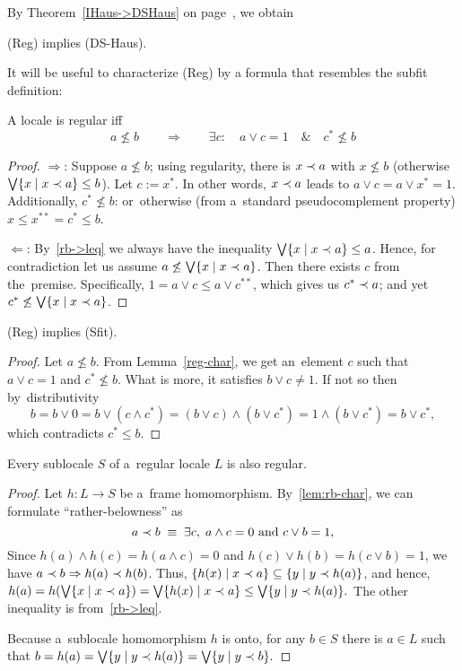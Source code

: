 By Theorem~\ref{IHaus->DSHaus} on page~\pageref{IHaus->DSHaus}\thinspace, we
obtain
\begin{cor}
  (Reg) implies (DS-Haus).
\end{cor}

It will be useful to characterize (Reg) by a formula that resembles the subfit
definition:
\begin{lem} \label{reg-char}
  A locale is regular iff
  \[
    a \not\le b \qquad \Rightarrow \qquad \exists c: \quad a \vee c = 1 \quad
    \& \quad c^* \not\leq b
  \]
\end{lem}
\begin{proof}
  $\Rightarrow$:
  Suppose $a \not\le b$;
  using regularity, there is $x \prec a$ with $x \not\le b$ (otherwise $\bigvee
  \{x \mid x \prec a\} \le b$).
  Let $c := x^*$.
  In other words, $x \prec a$ leads to $a \vee c = a \vee x^* = 1$.
  Additionally, $c^* \not\le b$:
  or~otherwise (from a~standard pseudocomplement property) $x \le x^{**} = c^*
  \le b$.

  $\Leftarrow$:
  By~\ref{rb->leq} we always have the inequality $\bigvee \{x \mid x \prec a\} \le
  a$.
  Hence, for contradiction let us assume $a \not\le \bigvee \{x \mid x \prec a\}$.
  Then there exists $c$ from the~premise.
  Specifically, $1 = a \vee c \le a \vee c^{**}$, which gives us $c^* \prec a$;
  and yet $c^* \not\le \bigvee \{x \mid x \prec a\}$.
\end{proof}

\begin{thm} \label{thm:reg->sfit}
  (Reg) implies (Sfit).
\end{thm}
\begin{proof}
  Let $a \not\le b$.
  From Lemma~\ref{reg-char}\thinspace, we get an~element $c$ such that $a \vee
  c = 1$ and $c^* \not\le b$.
  What is more, it satisfies $b \vee c \ne 1$.
  If not so then by~distributivity
  \[
    b = b \vee 0 = b \vee (c \wedge c^*) = (b \vee c) \wedge (b \vee c^*) = 1
    \wedge (b \vee c^*) = b \vee c^*,
  \]
  which contradicts $c^* \le b$.
\end{proof}

\begin{prop} \label{prop:sloc-of-reg}
  Every sublocale $S$ of a~regular locale $L$ is also regular.
\end{prop}
\begin{proof}
  Let $h\colon L \to S$ be a~frame homomorphism.
  By~\ref{lem:rb-char}, we can formulate ``rather-belowness'' as
  \[
    a \prec b 
    \; \equiv \;
    \exists c, \; a \wedge c = 0 \text{ and } c \vee b = 1,
  \]
  Since $h(a) \wedge h(c) = h(a \wedge c) = 0$ and $h(c) \vee h(b) = h(c \vee
  b) = 1$, we have $a \prec b \Rightarrow h(a) \prec h(b)$.
  Thus, $\{ h(x) \mid x \prec a\} \subseteq \{ y \mid y \prec h(a)\}$, and hence,
  $
    h(a)
    = h (\bigvee \{ x \mid x \prec a\})
    = \bigvee \{ h(x) \mid x \prec a\}
    \le \bigvee \{ y \mid y \prec h(a) \}.
  $
  The other inequality is from~\ref{rb->leq}.

  Because a~sublocale homomorphism $h$ is onto, for any $b\in S$ there is $a\in
  L$ such that
  $
    b
    = h(a)
    = \bigvee \{ y \mid y \prec h(a) \}
    = \bigvee \{ y \mid y \prec b \}.
  $
\end{proof}

